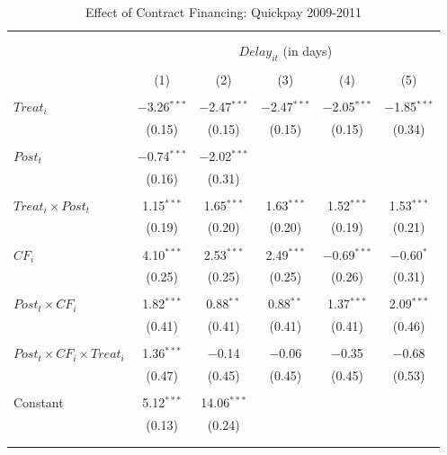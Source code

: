 \documentclass[
]{article}
\begin{document}
\begin{table}[H] \centering 
  \caption{Effect of Contract Financing: Quickpay 2009-2011} 
  \label{} 
\small 
\begin{tabular}{@{\extracolsep{-2pt}}lccccc} 
\\[-1.8ex]\hline 
\hline \\[-1.8ex] 
\\[-1.8ex] & \multicolumn{5}{c}{$Delay_{it}$ (in days)} \\ 
\\[-1.8ex] & (1) & (2) & (3) & (4) & (5)\\ 
\hline \\[-1.8ex] 
 $Treat_i$ & $-$3.26$^{***}$ & $-$2.47$^{***}$ & $-$2.47$^{***}$ & $-$2.05$^{***}$ & $-$1.85$^{***}$ \\ 
  & (0.15) & (0.15) & (0.15) & (0.15) & (0.34) \\ 
  & & & & & \\ 
 $Post_t$ & $-$0.74$^{***}$ & $-$2.02$^{***}$ &  &  &  \\ 
  & (0.16) & (0.31) &  &  &  \\ 
  & & & & & \\ 
 $Treat_i \times Post_t$ & 1.15$^{***}$ & 1.65$^{***}$ & 1.63$^{***}$ & 1.52$^{***}$ & 1.53$^{***}$ \\ 
  & (0.19) & (0.20) & (0.20) & (0.19) & (0.21) \\ 
  & & & & & \\ 
 $CF_i$ & 4.10$^{***}$ & 2.53$^{***}$ & 2.49$^{***}$ & $-$0.69$^{***}$ & $-$0.60$^{*}$ \\ 
  & (0.25) & (0.25) & (0.25) & (0.26) & (0.31) \\ 
  & & & & & \\ 
 $Post_t \times CF_i$ & 1.82$^{***}$ & 0.88$^{**}$ & 0.88$^{**}$ & 1.37$^{***}$ & 2.09$^{***}$ \\ 
  & (0.41) & (0.41) & (0.41) & (0.41) & (0.46) \\ 
  & & & & & \\ 
 $Post_t \times CF_i \times Treat_i$ & 1.36$^{***}$ & $-$0.14 & $-$0.06 & $-$0.35 & $-$0.68 \\ 
  & (0.47) & (0.45) & (0.45) & (0.45) & (0.53) \\ 
  & & & & & \\ 
 Constant & 5.12$^{***}$ & 14.06$^{***}$ &  &  &  \\ 
  & (0.13) & (0.24) &  &  &  \\ 
  & & & & & \\ 
\hline \\[-1.8ex] 

\end{tabular}
\end{table}
\end{document}
